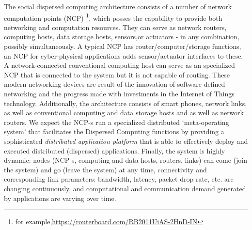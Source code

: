 \documentclass[12pt,letterpaper]{article}
\begin{document}
The social dispersed computing architecture consists of a number of network computation points (NCP) \footnote{for example,\url{https://routerboard.com/RB2011UiAS-2HnD-IN}}, which posses the capability to provide both networking and computation resources. They can serve as network routers, computing hosts, data storage hosts, sensors,or actuators - in any combination, possibly simultaneously. A typical NCP has router/computer/storage functions, an NCP for cyber-physical applications adds sensor/actuator interfaces to these. A network-connected conventional computing host can serve as an specialized NCP that is connected to the system but it is not capable of routing. These modern networking devices are result of the innovation of software defined networking and the progress made with investments in the Internet of Things technology. Additionally, the architecture consists of smart phones, network links, as well as conventional computing and data storage hosts and as well as network routers. We expect the  NCP-s run a specialized distributed `meta-operating system'  that facilitates the Dispersed Computing functions by providing a sophisticated \textit{distributed application platform} that is able to effectively deploy and executed distributed (dispersed) applications.  Finally, the system is highly dynamic: nodes (NCP-s, computing and data hosts, routers, links) can come (join the system) and go (leave the system) at any time, connectivity and corresponding link parameters: bandwidth, latency, packet drop rate, etc. are changing continuously, and computational and communication demand generated by applications are varying over time. 
\end{document}

